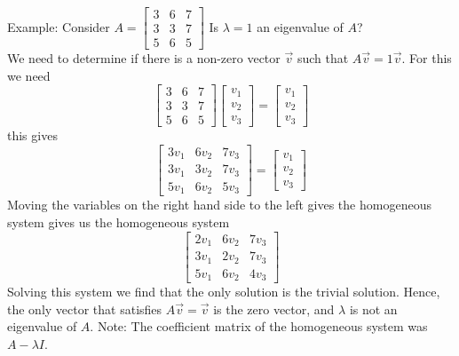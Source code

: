 \documentclass[10pt,letter]{article}
\begin{document}
Example: Consider $A=\begin{bmatrix}3&6&7\\3&3&7\\5&6&5\end{bmatrix}$ Is $\lambda=1$ an eigenvalue of $A$? \\ 
We need to determine if there is a non-zero vector $\vec{v}$ such that $A\vec{v}=1\vec{v}$. For this we need $$\begin{bmatrix}3&6&7\\3&3&7\\5&6&5\end{bmatrix}\begin{bmatrix}v_1\\v_2\\v_3\end{bmatrix}=\begin{bmatrix}v_1\\v_2\\v_3\end{bmatrix}$$ this gives $$\begin{bmatrix}3v_1&6v_2&7v_3\\3v_1&3v_2&7v_3\\5v_1&6v_2&5v_3\end{bmatrix}=\begin{bmatrix}v_1\\v_2\\v_3\end{bmatrix}$$ Moving the variables on the right hand side to the left gives the homogeneous system gives us the homogeneous system $$\begin{bmatrix}2v_1&6v_2&7v_3\\3v_1&2v_2&7v_3\\5v_1&6v_2&4v_3\end{bmatrix}$$ Solving this system we find that the only solution is the trivial solution. Hence, the only vector that satisfies $A\vec{v}=\vec{v}$ is the zero vector, and $\lambda$ is not an eigenvalue of $A$. Note: The coefficient matrix of the homogeneous system was $A-\lambda I$. 
\end{document}
